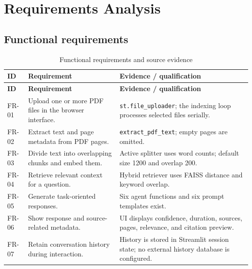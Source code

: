 \chapter{Requirements Analysis}
\label{ch:requirements}

\section{Functional requirements}
\begin{longtable}{p{}p{}p{}}
\caption{Functional requirements and source evidence}\label{tab:functional-requirements}\\
\toprule
\textbf{ID} & \textbf{Requirement} & \textbf{Evidence / qualification}\\
\midrule
\endfirsthead
\toprule
\textbf{ID} & \textbf{Requirement} & \textbf{Evidence / qualification}\\
\midrule
\endhead
FR-01 & Upload one or more PDF files in the browser interface. & \texttt{st.file\_uploader}; the indexing loop processes selected files serially.\\
FR-02 & Extract text and page metadata from PDF pages. & \texttt{extract\_pdf\_text}; empty pages are omitted.\\
FR-03 & Divide text into overlapping chunks and embed them. & Active splitter uses word counts; default size 1200 and overlap 200.\\
FR-04 & Retrieve relevant context for a question. & Hybrid retriever uses FAISS distance and keyword overlap.\\
FR-05 & Generate task-oriented responses. & Six agent functions and six prompt templates exist.\\
FR-06 & Show response and source-related metadata. & UI displays confidence, duration, sources, pages, relevance, and citation preview.\\
FR-07 & Retain conversation history during interaction. & History is stored in Streamlit session state; no external history database is configured.\\
\bottomrule
\end{longtable}

